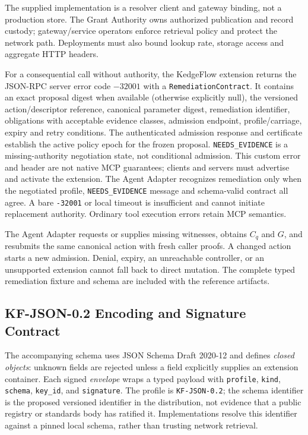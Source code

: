 The supplied implementation is a resolver client and gateway binding, not a production store. The Grant Authority owns authorized publication and record custody; gateway/service operators enforce retrieval policy and protect the network path. Deployments must also bound lookup rate, storage access and aggregate HTTP headers.

For a consequential call without authority, the KedgeFlow extension returns the JSON-RPC server error code $-32001$ with a \texttt{RemediationContract}. It contains an exact proposal digest when available (otherwise explicitly null), the versioned action/descriptor reference, canonical parameter digest, remediation identifier, obligations with acceptable evidence classes, admission endpoint, profile/carriage, expiry and retry conditions. The authenticated admission response and certificate establish the active policy epoch for the frozen proposal. \texttt{NEEDS\_EVIDENCE} is a missing-authority negotiation state, not conditional admission. This custom error and header are not native MCP guarantees; clients and servers must advertise and activate the extension. The Agent Adapter recognizes remediation only when the negotiated profile, \texttt{NEEDS\_EVIDENCE} message and schema-valid contract all agree. A bare \texttt{-32001} or local timeout is insufficient and cannot initiate replacement authority. Ordinary tool execution errors retain MCP semantics.

The Agent Adapter requests or supplies missing witnesses, obtains $C_q$ and $G$, and resubmits the same canonical action with fresh caller proofs. A changed action starts a new admission. Denial, expiry, an unreachable controller, or an unsupported extension cannot fall back to direct mutation. The complete typed remediation fixture and schema are included with the reference artifacts.

\subsection{KF-JSON-0.2 Encoding and Signature Contract}
\label{sec:wire-profile}
The accompanying schema uses JSON Schema Draft 2020-12 and defines \emph{closed objects}: unknown fields are rejected unless a field explicitly supplies an extension container. Each signed \emph{envelope} wraps a typed payload with \texttt{profile}, \texttt{kind}, \texttt{schema}, \texttt{key\_id}, and \texttt{signature}. The profile is \texttt{KF-JSON-0.2}; the schema identifier is the proposed versioned identifier in the distribution, not evidence that a public registry or standards body has ratified it. Implementations resolve this identifier against a pinned local schema, rather than trusting network retrieval.

